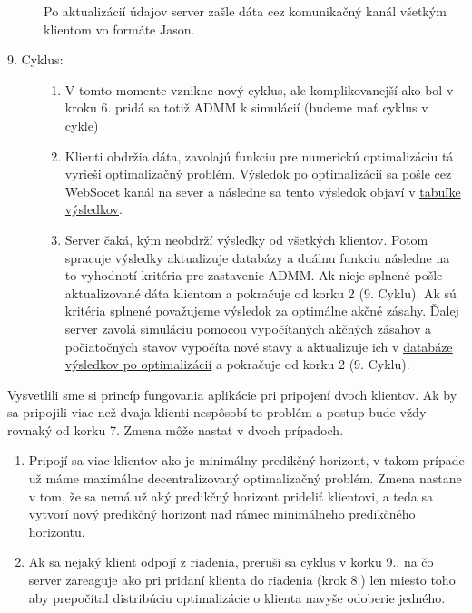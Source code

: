 \begin{description}
{\begin{enumerate}
{			Po aktualizácií údajov server zašle dáta cez komunikačný kanál všetkým klientom vo formáte Jason.
		}
	\end{enumerate}
}
\item[9. Cyklus:]{\hfill
	\begin{enumerate}
		\item{V tomto momente vznikne nový cyklus, ale komplikovanejší ako bol v kroku 6. pridá sa totiž ADMM k simulácií (budeme mať cyklus v cykle)}
		\item{Klienti obdržia dáta, zavolajú funkciu pre numerickú optimalizáciu tá vyrieši optimalizačný problém. Výsledok po optimalizácií sa pošle cez WebSocet kanál na sever a následne sa tento výsledok objaví v \hyperref[fig:Tabulka]{tabuľke výsledkov}.}
		\item{
			Server čaká, kým neobdrží výsledky od všetkých klientov. Potom spracuje výsledky aktualizuje databázy a duálnu funkciu následne na to vyhodnotí kritéria pre zastavenie ADMM. Ak nieje splnené pošle aktualizované dáta klientom a pokračuje od korku 2 (9. Cyklu). Ak sú kritéria splnené považujeme výsledok za optimálne akčné zásahy. Ďalej server zavolá simuláciu pomocou vypočítaných akčných zásahov a počiatočných stavov vypočíta nové stavy a aktualizuje ich v \hyperref[DB:WORKER_DATA]{databáze výsledkov po optimalizácií} a pokračuje od korku 2 (9. Cyklu).
		}
	\end{enumerate}
}
\end{description}
Vysvetlili sme si princíp fungovania aplikácie pri pripojení dvoch klientov. Ak by sa pripojili viac než dvaja klienti nespôsobí to problém a postup bude vždy rovnaký od korku 7. Zmena môže nastať v dvoch prípadoch.
\begin{enumerate}
	\item{
	 Pripojí sa viac klientov ako je minimálny predikčný horizont, v takom prípade už máme maximálne decentralizovaný optimalizačný problém. Zmena nastane v tom, že sa nemá už aký predikčný horizont prideliť klientovi, a teda sa vytvorí nový predikčný horizont nad rámec minimálneho predikčného horizontu.
	}
	\item{
	Ak sa nejaký klient odpojí z riadenia, preruší sa cyklus v korku 9., na čo server zareaguje ako pri pridaní klienta do riadenia (krok 8.) len miesto toho aby prepočítal distribúciu optimalizácie o klienta navyše odoberie jedného. 
	}
\end{enumerate}

